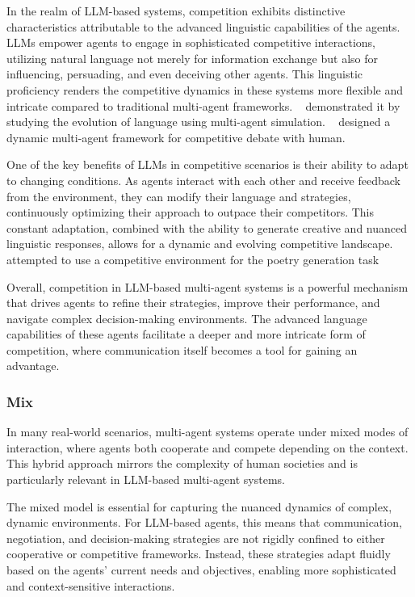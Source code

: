 In the realm of LLM-based systems, competition exhibits distinctive characteristics attributable to the advanced linguistic capabilities of the agents. LLMs empower agents to engage in sophisticated competitive interactions, utilizing natural language not merely for information exchange but also for influencing, persuading, and even deceiving other agents. This linguistic proficiency renders the competitive dynamics in these systems more flexible and intricate compared to traditional multi-agent frameworks. ~\cite{social_media_regulation} demonstrated it by studying the evolution of language using multi-agent simulation. ~\cite{agent4debate} designed a dynamic multi-agent framework for competitive debate with human.

One of the key benefits of LLMs in competitive scenarios is their ability to adapt to changing conditions. As agents interact with each other and receive feedback from the environment, they can modify their language and strategies, continuously optimizing their approach to outpace their competitors. This constant adaptation, combined with the ability to generate creative and nuanced linguistic responses, allows for a dynamic and evolving competitive landscape.~\cite{mas_for_poetry_generation} attempted to use a competitive environment for the poetry generation task

Overall, competition in LLM-based multi-agent systems is a powerful mechanism that drives agents to refine their strategies, improve their performance, and navigate complex decision-making environments. The advanced language capabilities of these agents facilitate a deeper and more intricate form of competition, where communication itself becomes a tool for gaining an advantage.


\subsubsection{Mix}
In many real-world scenarios, multi-agent systems operate under mixed modes of interaction, where agents both cooperate and compete depending on the context. This hybrid approach mirrors the complexity of human societies and is particularly relevant in LLM-based multi-agent systems.

The mixed model is essential for capturing the nuanced dynamics of complex, dynamic environments. For LLM-based agents, this means that communication, negotiation, and decision-making strategies are not rigidly confined to either cooperative or competitive frameworks. Instead, these strategies adapt fluidly based on the agents' current needs and objectives, enabling more sophisticated and context-sensitive interactions.

